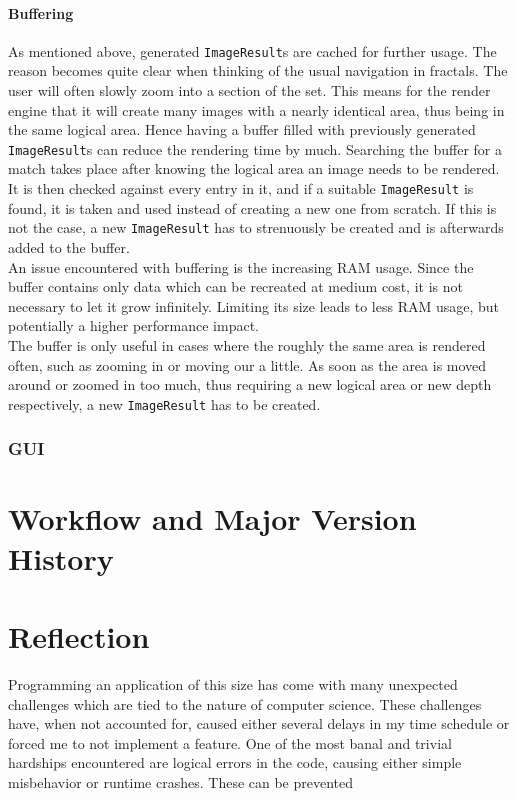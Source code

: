 \documentclass[10pt,a4paper,titlepage]{article}
\begin{document}
	\paragraph{Buffering} \label{par:paragraph_image_creation_buffering}
	As mentioned above, generated \verb|ImageResult|s are cached for further usage. The reason becomes quite clear when thinking of the usual navigation in fractals. The user will often slowly zoom into a section of the set. This means for the render engine that it will create many images with a nearly identical area, thus being in the same logical area. Hence having a buffer filled with previously generated \verb|ImageResult|s can reduce the rendering time by much. Searching the buffer for a match takes place after knowing the logical area an image needs to be rendered. It is then checked against every entry in it, and if a suitable \verb|ImageResult| is found, it is taken and used instead of creating a new one from scratch. If this is not the case, a new \verb|ImageResult| has to strenuously be created and is afterwards added to the buffer.\\
	An issue encountered with buffering is the increasing RAM usage. Since the buffer contains only data which can be recreated at medium cost, it is not necessary to let it grow infinitely. Limiting its size leads to less RAM usage, but potentially a higher performance impact.\\ The buffer is only useful in cases where the roughly the same area is rendered often, such as zooming in or moving our a little. As soon as the area is moved around or zoomed in too much, thus requiring a new logical area or new depth respectively, a new \verb|ImageResult| has to be created.
	\subsubsection{GUI}
	\section{Workflow and Major Version History}
	
	\section{Reflection}
	Programming an application of this size has come with many unexpected challenges which are tied to the nature of computer science. These challenges have, when not accounted for, caused either several delays in my time schedule or forced me to not implement a feature. One of the most banal and trivial hardships encountered are logical errors in the code, causing either simple misbehavior or runtime crashes. These can be prevented 
	
	
	
	
	
	
	
	
	
	
	\clearpage
	\appendix
	\printbibliography
\end{document}
